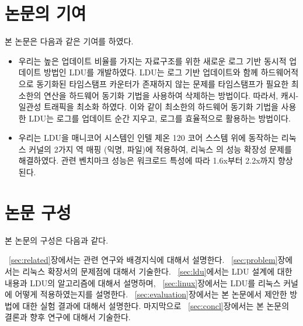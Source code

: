 \newpage
\section{논문의 기여}\label{sec:introcontri}
본 논문은 다음과 같은 기여를 하였다.
\begin{itemize}
\item 우리는 높은 업데이트 비율를 가지는 자료구조를 위한 새로운 로그 기반 동시적 업데이트
 방법인 LDU를 개발하였다.
LDU는 로그 기반 업데이트와 함께 하드웨어적으로 동기화된 타임스탬프 카운터가 존재하지 않는 문제를 
타임스탬프가 필요한 최소한의 연산을 하드웨어 동기화 기법을 사용하여 삭제하는 방법이다.
따라서, 캐시-일관성 트래픽을 최소화 하였다.
이와 같이 최소한의 하드웨어 동기화 기법을 사용한 LDU는 로그를 업데이트 순간 지우고, 
로그를 효율적으로 활용하는 방법이다.  
\item 
우리는 LDU을 매니코어 시스템인 인텔 제온 120 코어 스스템 위에 동작하는 리눅스 커널의 
2가지 역 매핑 (익명, 파일)에 적용하여, 리눅스 의 성능 확장성 문제를 해결하였다.
 관련 벤치마크 성능은 워크로드 특성에 따라 1.6x부터 2.2x까지 향상된다.
\end{itemize}


\newpage
\section{논문 구성} \label{sec:intro}
본 논문의 구성은 다음과 같다.

~\ref{sec:related}장에서는 관련 연구와 배경지식에 대해서 설명한다.
~\ref{sec:problem}장에서는 리눅스 확장서의 문제점에 대해서 기술한다. 
~\ref{sec:ldu}에서는 LDU 설계에 대한 내용과 LDU의 알고리즘에 대해서 설명하며,
~\ref{sec:linux}장에서는 LDU를 리눅스 커널에 어떻게 적용하였는지를 설명한다.
~\ref{sec:evaluation}장에서는 본 논문에서 제안한 방법에 대한 실험 결과에 대해서 설명한다. 
마지막으로 ~\ref{sec:concl}장에서는 본 논문의 결론과 향후 연구에 대해서 기술한다. 

